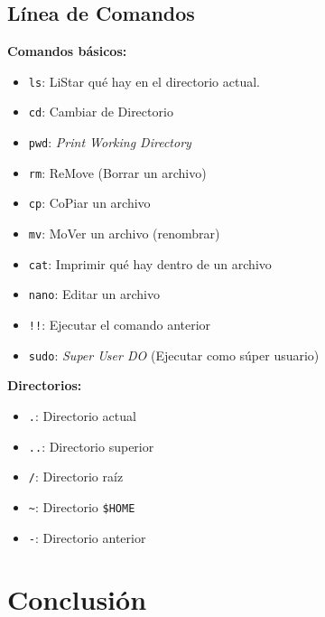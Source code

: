 \documentclass[aspectratio=43]{beamer}
\begin{document}
    \subsection{Línea de Comandos}
     \begin{frame}[fragile]{\subsecname}{}
        \textbf{Comandos básicos:}
        \begin{itemize}
            \item \verb!ls!: LiStar qué hay en el directorio actual.
            \item \verb!cd!: Cambiar de Directorio
            \item \verb!pwd!: \textit{Print Working Directory}
            \item \verb!rm!: ReMove (Borrar un archivo)
            \item \verb!cp!: CoPiar un archivo
            \item \verb!mv!: MoVer un archivo (renombrar)
            \item \verb!cat!: Imprimir qué hay dentro de un archivo
            \item \verb!nano!: Editar un archivo
            \item \verb|!!|: Ejecutar el comando anterior
            \item \verb|sudo|: \textit{Super User DO} (Ejecutar como súper usuario)
        \end{itemize}
    \end{frame}

    \begin{frame}[fragile]{\subsecname}{}
        \textbf{Directorios:}
        \begin{itemize}
            \item \verb!.!: Directorio actual
            \item \verb!..!: Directorio superior
            \item \verb!/!: Directorio raíz
            \item \verb!~!: Directorio \verb!$HOME!
            \item \verb!-!: Directorio anterior
        \end{itemize}
    \end{frame}


    \section{Conclusión}
\end{document}

